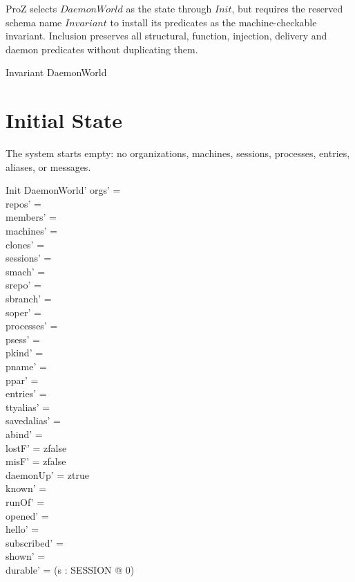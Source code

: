 \documentclass[a4paper,10pt,fleqn]{article}
\begin{document}
ProZ selects $DaemonWorld$ as the state through $Init$, but requires the
reserved schema name $Invariant$ to install its predicates as the
machine-checkable invariant.  Inclusion preserves all structural,
function, injection, delivery and daemon predicates without duplicating
them.

\begin{schema}{Invariant}
  DaemonWorld
\end{schema}

\section{Initial State}

The system starts empty: no organizations, machines, sessions,
processes, entries, aliases, or messages.

\begin{schema}{Init}
  DaemonWorld'
  \where
  orgs' = \emptyset \\
  repos' = \emptyset \\
  members' = \emptyset \\
  machines' = \emptyset \\
  clones' = \emptyset \\
  sessions' = \emptyset \\
  smach' = \emptyset \\
  srepo' = \emptyset \\
  sbranch' = \emptyset \\
  soper' = \emptyset \\
  processes' = \emptyset \\
  psess' = \emptyset \\
  pkind' = \emptyset \\
  pname' = \emptyset \\
  ppar' = \emptyset \\
  entries' = \emptyset \\
  ttyalias' = \emptyset \\
  savedalias' = \emptyset \\
  abind' = \emptyset \\
  lostF' = zfalse \\
  misF' = zfalse \\
  daemonUp' = ztrue \\
  known' = \emptyset \\
  runOf' = \emptyset \\
  opened' = \emptyset \\
  hello' = \emptyset \\
  subscribed' = \emptyset \\
  shown' = \emptyset \\
  durable' = (\lambda s : SESSION @ 0)
\end{schema}
\end{document}
